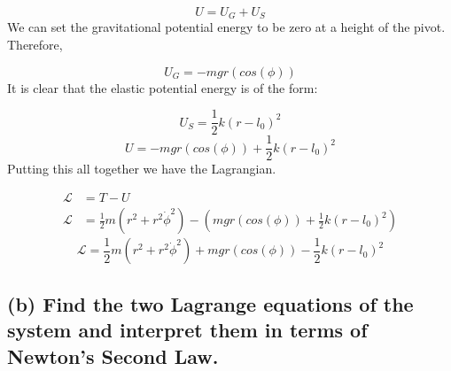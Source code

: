 \documentclass{article}
\begin{document}
$$U = U_G + U_S$$
We can set the gravitational potential energy to be zero at a height of the pivot. Therefore,


$$U_G = -mgr(cos(\phi))$$
It is clear that the elastic potential energy is of the form:

$$U_S = \frac{1}{2}k(r-l_0)^2$$
$$U = -mgr(cos(\phi)) + \frac{1}{2}k(r-l_0)^2$$
Putting this all together we have the Lagrangian. 

\begin{align*}
\mathcal{L} &= T - U\\
\mathcal{L} &= \frac{1}{2}m(r^2 + r^2\dot{\phi}^2) - \left( mgr(cos(\phi)) + \frac{1}{2}k(r-l_0)^2 \right) 
\end{align*}
$$\boxed{\mathcal{L} = \frac{1}{2}m(r^2 + r^2\dot{\phi}^2) +mgr(cos(\phi)) - \frac{1}{2}k(r-l_0)^2}$$


\subsection*{(b) Find the two Lagrange equations of the system and interpret them in terms of Newton's Second Law.}
\end{document}
